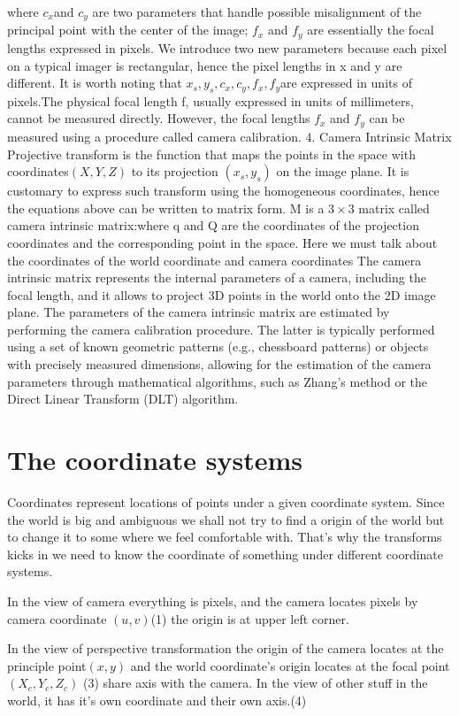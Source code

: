 \documentclass{article}
\begin{document}
where $c_x$and $c_y$
are two parameters that handle possible misalignment of the principal point with the center of the image; $f_x$ and $f_y$
are essentially the focal lengths expressed in pixels. We introduce two new parameters because each pixel on a typical imager is rectangular, hence the pixel lengths in x and y are different. It is worth noting that $x_s,y_s,c_x,c_y,f_x,f_y$are expressed in units of pixels.The physical focal length f, usually expressed in units of millimeters, cannot be measured directly. However, the focal lengths $f_x$ and $f_y$ can be measured using a procedure called camera calibration.
4. Camera Intrinsic Matrix
Projective transform is the function that maps the points in the space with coordinates$(X, Y, Z)$ to its projection $(x_s, y_s)$ on the image plane. It is customary to express such transform using the homogeneous coordinates, hence the equations above can be written to matrix form.
M is a $3\times3$ matrix called camera intrinsic matrix:where q and Q are the coordinates of the projection coordinates  and the corresponding point in the space.
Here we must talk about the coordinates of the world coordinate and camera coordinates
The camera intrinsic matrix represents the internal parameters of a camera, including the focal length, and it allows to project 3D points in the world onto the 2D image plane.
The parameters of the camera intrinsic matrix are estimated by performing the camera calibration procedure. The latter is typically performed using a set of known geometric patterns (e.g., chessboard patterns) or objects with precisely measured dimensions, allowing for the estimation of the camera parameters through mathematical algorithms, such as Zhang's method or the Direct Linear Transform (DLT) algorithm.
\section{The coordinate systems}
Coordinates represent locations of points under a given coordinate system. Since the world is big and ambiguous we shall not try to find a origin of the world but to change it to some where we feel comfortable with. That's why the transforms kicks in we need to know the coordinate of something under different coordinate systems.

In the view of camera everything is pixels, and the camera locates pixels by camera coordinate $(u,v)$(1) the origin is at upper left corner.

In the view of perspective transformation the origin of the camera locates at the principle
point$(x,y)$ and the world coordinate's origin locates at the focal point$(X_c,Y_c,Z_c)$ (3) share axis with the camera.
In the view of other stuff in the world, it has it's own coordinate and their own axis.(4)
\end{document}
